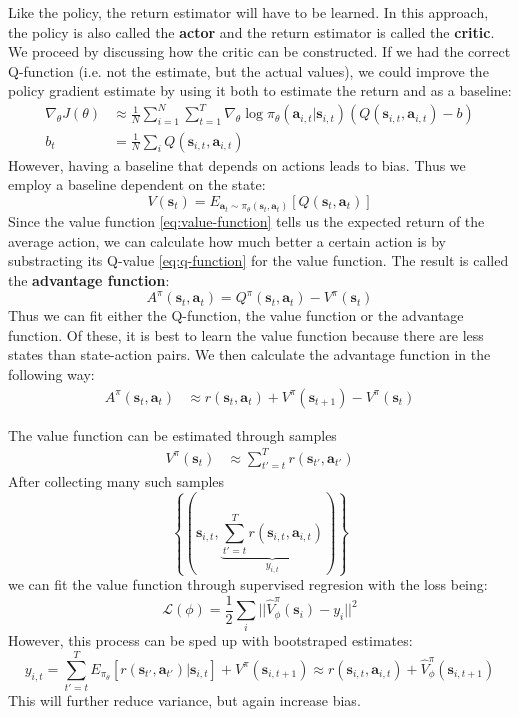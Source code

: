 Like the policy, the return estimator will have to be learned.
In this approach, the policy is also called the \textbf{actor} 
and the return estimator is called the \textbf{critic}.
We proceed by discussing how the critic can be constructed.
If we had the correct Q-function (i.e. not the estimate, but the actual values),
we could improve the policy gradient estimate by using it
both to estimate the return and as a baseline:
\begin{align}
		\nabla_\theta J(\theta) &\approx \frac{1}{N} \sum_{i=1}^{N} \sum_{t=1}^{T} \nabla_\theta \log \pi_\theta (\bm{a}_{i,t}| \bm{s}_{i,t})
( Q(\bm{s}_{i,t}, \bm{a}_{i,t}) - b) \\
		b_t &= \frac{1}{N} \sum_{i}^{} Q(\bm{s}_{i,t}, \bm{a}_{i,t})
\end{align}
However, having a baseline that depends on actions leads to bias.
Thus we employ a baseline dependent on the state:
\begin{equation}
		V(\bm{s}_t) = E_{\bm{a}_t \sim \pi_\theta (\bm{s}_{t}, \bm{a}_{t})} [Q(\bm{s}_{t}, \bm{a}_{t})]
\end{equation}
Since the value function \ref{eq:value-function} tells us the expected return of the average action,
we can calculate how much better a certain action is by substracting
its Q-value \ref{eq:q-function} for the value function.
The result is called the \textbf{advantage function}:
\begin{equation}
A^\pi (\bm{s}_{t}, \bm{a}_{t}) = Q^\pi (\bm{s}_{t}, \bm{a}_{t}) - V^\pi (\bm{s}_t)
\end{equation}
Thus we can fit either the Q-function, the value function or the advantage function.
Of these, it is best to learn the value function because there are less 
states than state-action pairs.
We then calculate the advantage function in the following way:
\begin{align}
		A^\pi (\bm{s}_{t}, \bm{a}_{t})  &\approx r(\bm{s}_{t}, \bm{a}_{t}) + V^\pi (\bm{s}_{t+1})  - V^\pi(\bm{s}_t)
\end{align}

The value function can be estimated through samples
\begin{align}
		V^\pi (\bm{s}_t) &\approx \sum_{t'=t}^{T} r(\bm{s}_{t'}, \bm{a}_{t'})
\end{align}
After collecting many such samples
\begin{equation}
		\left\{ \left( \bm{s}_{i,t}, \underbrace{\sum_{t'=t}^{T} r(\bm{s}_{i,t}, \bm{a}_{i,t})}_{y_{i,t}} \right)  \right\} 
\end{equation}
we can fit the value function through supervised regresion with the loss being:
\begin{equation}
		\mathcal{L}(\phi) = \frac{1}{2} \sum_{i}^{} ||\hat{V}^\pi_\phi (\bm{s}_i) - y_i||^2
\end{equation}
However, this process can be sped up with bootstraped estimates:
\begin{equation}
		y_{i,t} = \sum_{t'=t}^{T} E_{\pi_\theta} \left[ r(\bm{s}_{t'}, \bm{a}_{t'})|\bm{s}_{i,t}\right] + V^\pi(\bm{s}_{i,t+1})  
		\approx r(\bm{s}_{i,t}, \bm{a}_{i,t}) + \hat{V}^\pi_\phi(\bm{s}_{i,t+1}) 
\end{equation}
This will further reduce variance, but again increase bias.

